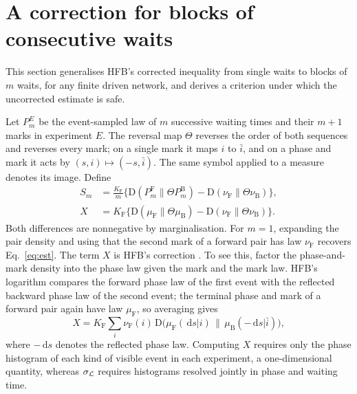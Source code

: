 \documentclass[11pt,a4paper]{article}
\newcommand{\KL}{\mathrm D}
\newcommand{\F}{\mathrm F}
\newcommand{\B}{\mathrm B}
\newcommand{\dd}{\,\mathrm d}
\begin{document}
\section{A correction for blocks of consecutive waits}\label{sec:block}
This section generalises HFB's corrected inequality from single waits to blocks of $m$ waits, for any finite driven network, and derives a criterion under which the uncorrected estimate is safe.

Let $P_m^E$ be the event-sampled law of $m$ successive waiting times and their $m+1$ marks in experiment $E$. The reversal map $\Theta$ reverses the order of both sequences and reverses every mark; on a single mark it maps $i$ to $\bar i$, and on a phase and mark it acts by $(s,i)\mapsto(-s,\bar i)$. The same symbol applied to a measure denotes its image. Define
\begin{align}
 S_m&=\frac{K_\F}{m}\{\KL(P_m^\F\|\Theta P_m^\B)
                       -\KL(\nu_\F\|\Theta\nu_\B)\},\label{eq:block}\\
 X&=K_\F\{\KL(\mu_\F\|\Theta\mu_\B)-\KL(\nu_\F\|\Theta\nu_\B)\}.\label{eq:x}
\end{align}
Both differences are nonnegative by marginalisation. For $m=1$, expanding the pair density and using that the second mark of a forward pair has law $\nu_\F$ recovers Eq.~\eqref{eq:est}. The term $X$ is HFB's correction \cite[Eq.~(25)]{hfb}. To see this, factor the phase-and-mark density into the phase law given the mark and the mark law. HFB's logarithm compares the forward phase law of the first event with the reflected backward phase law of the second event; the terminal phase and mark of a forward pair again have law $\mu_\F$, so averaging gives
\[
 X=K_\F\sum_i\nu_\F(i)\,
 \KL\big(\mu_\F(\dd s|i)\,\big\|\,\mu_\B(-\dd s|\bar i)\big),
\]
where $-\dd s$ denotes the reflected phase law. Computing $X$ requires only the phase histogram of each kind of visible event in each experiment, a one-dimensional quantity, whereas $\sigma_{\cal L}$ requires histograms resolved jointly in phase and waiting time.
\end{document}
